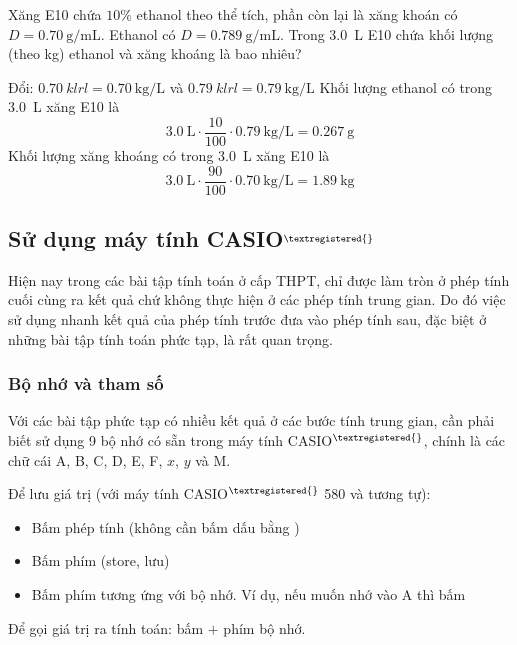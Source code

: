 \begin{vidu}
	Xăng E10 chứa \(10\%\) ethanol theo thể tích, phần còn lại là xăng khoán có \(D=\SI{0.70}{\gram\per\milli\liter}\). Ethanol có \(D=\SI{0.789}{\gram\per\milli\liter}\). Trong \SI{3.0}{\liter} E10 chứa khối lượng (theo \si{\kg}) ethanol và xăng khoáng là bao nhiêu?
\end{vidu}
\begin{loigiai}
	Đổi: $\SI{0.70}{klrl} = \SI{0.70}{\kg\per\L}$ và $\SI{0.79}{klrl} = \SI{0.79}{\kg\per\L}$
	Khối lượng ethanol có trong \SI{3.0}{\L} xăng E10 là
	\[ \SI{3.0}{\L} \cdot \dfrac{10}{100} \cdot \SI{0.79}{\kg\per\L} = \SI{0.267}{\g} \]
	Khối lượng xăng khoáng có trong \SI{3.0}{\L} xăng E10 là
	\[ \SI{3.0}{\L} \cdot \dfrac{90}{100} \cdot \SI{0.70}{\kg\per\L} = \SI{1.89}{\kg} \]
\end{loigiai}

\subsection*{Sử dụng máy tính CASIO$^{\textregistered{}}$}
Hiện nay trong các bài tập tính toán ở cấp THPT, chỉ được làm tròn ở phép tính cuối cùng ra kết quả chứ không thực hiện ở các phép tính trung gian. Do đó việc sử dụng nhanh kết quả của phép tính trước đưa vào phép tính sau, đặc biệt ở những bài tập tính toán phức tạp, là rất quan trọng.

\subsubsection*{Bộ nhớ và tham số}
Với các bài tập phức tạp có nhiều kết quả ở các bước tính trung gian, cần phải biết sử dụng 9 bộ nhớ có sẵn trong máy tính CASIO$^{\textregistered{}}$, chính là các chữ cái \textsc{A, B, C, D, E, F,} $x$, $y$ và \textsc{M}.

Để lưu giá trị (với máy tính CASIO$^{\textregistered{}}$ 580 và tương tự):
\begin{itemize}
	\item Bấm phép tính (không cần bấm dấu bằng \fbox{$=$}  )
	\item Bấm phím  (store, lưu)
	\item Bấm phím tương ứng với bộ nhớ. Ví dụ, nếu muốn nhớ vào \textsc{A} thì bấm \fbox{(--)}
\end{itemize}

Để gọi giá trị ra tính toán: bấm  $+$ phím bộ nhớ.

